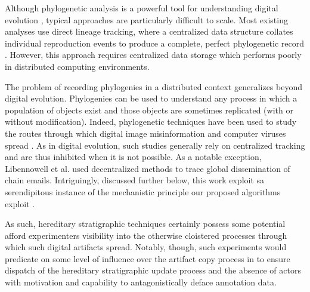 Although phylogenetic analysis is a powerful tool for understanding digital evolution \citep{dolson2020interpreting}, typical approaches are particularly difficult to scale. %
Most existing analyses use direct lineage tracking, where a centralized data structure collates individual reproduction events to produce a complete, perfect phylogenetic record \citep{dolson2023phylotrackpy}.
However, this approach requires centralized data storage which performs poorly in distributed computing environments. %

The problem of recording phylogenies in a distributed context generalizes beyond digital evolution.
Phylogenies can be used to understand any process in which a population of objects exist and those objects are sometimes replicated (with or without modification).
Indeed, phylogenetic techniques have been used to study the routes through which digital image misinformation and computer viruses spread \citep{friggeri2014rumor,cohen1987computer}.
As in digital evolution, such studies generally rely on centralized tracking and are thus inhibited when it is not possible.
As a notable exception, Libennowell et al. used decentralized methods to trace global dissemination of chain emails.
Intriguingly, discussed further below, this work exploit sa serendipitous instance of the mechanistic principle our proposed algorithms exploit \cite{libennowell2008tracing}.

As such, hereditary stratigraphic techniques certainly possess some potential afford experimenters visibility into the otherwise cloistered processes through which such digital artifacts spread.
Notably, though, such experiments would predicate on some level of influence over the artifact copy process in to ensure dispatch of the hereditary stratigraphic update process and the absence of actors with motivation and capability to antagonistically deface annotation data.

